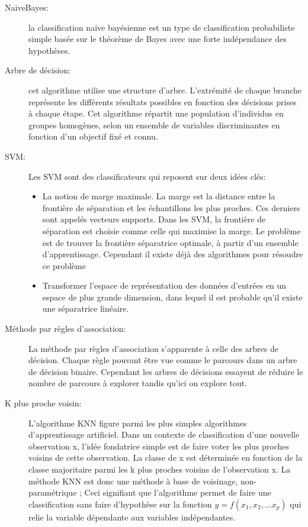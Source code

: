 \documentclass[a4paper,11pt]{report}
\begin{document}
\begin{description}
 \item [NaiveBayes: ] la classification naïve bayésienne est un type de classification probabiliste simple basée sur le théorème de Bayes avec une forte indépendance des 
 hypothèses. \\
 
 \item [Arbre de décision: ] cet algorithme utilise une structure d'arbre. L'extrémité de chaque branche représente les différents résultats possibles 
 en fonction des décisions prises à chaque étape. Cet algorithme  répartit une population d'individus en groupes homogènes, selon un ensemble 
 de variables discriminantes en fonction d'un objectif fixé et connu.\\
 
 \item [SVM: ] Les SVM sont des classificateurs qui reposent sur deux idées clés:
 
\begin{itemize}
 \item La notion de marge maximale. La marge est la distance entre la frontière de séparation et les échantillons les plus proches. 
Ces derniers sont appelés vecteurs supports. Dans les SVM, la frontière de séparation est choisie comme celle qui maximise la marge. 
Le problème est de trouver la frontière séparatrice optimale, à partir d'un ensemble d'apprentissage. Cependant il existe déjà des algorithmes pour résoudre ce 
problème
 \item  Transformer l'espace de représentation des données d'entrées en un espace de plus grande dimension, dans lequel il est probable qu'il existe une 
 séparatrice linéaire. \\
 
\end{itemize}
 \item [Méthode par règles d'association: ] La méthode par règles d’association s’apparente à celle des arbres de décision. Chaque règle pouvant être 
 vue comme le parcours dans un arbre de décision binaire. Cependant les arbres de décisions essayent de réduire le nombre de parcours à explorer tandis 
 qu’ici on explore tout.\\
 
 \item [K plus proche voisin: ] L’algorithme KNN figure parmi les plus simples algorithmes d’apprentissage artificiel. Dans un contexte de classification d’une 
 nouvelle observation x, l’idée fondatrice simple est de faire voter les plus proches voisins de cette observation. La classe de x est déterminée en fonction de la 
 classe majoritaire parmi les k plus proches voisins de l’observation x. La méthode KNN est donc une méthode à base de voisinage, non-paramétrique ; Ceci signifiant 
 que l’algorithme permet de faire une classification sans faire d’hypothèse sur la fonction $y=f(x_1,x_2,…x_p)$ qui relie la variable dépendante aux variables indépendantes. 
\end{description}
\end{document}
